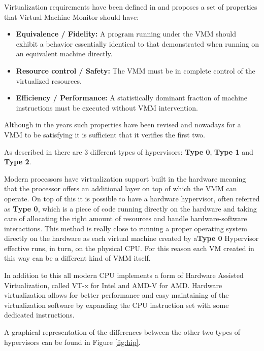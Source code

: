 Virtualization requirements have been defined in \cite{virtreq} and proposes a set of properties that Virtual Machine Monitor should have:

\begin{itemize}
    \item \textbf{Equivalence / Fidelity:} A program running under the VMM should exhibit a behavior essentially identical to that demonstrated when running on an equivalent machine directly.
    \item \textbf{Resource control / Safety:} The VMM must be in complete control of the virtualized resources.
    \item \textbf{Efficiency / Performance:} A statistically dominant fraction of machine instructions must be executed without VMM intervention.
\end{itemize}

Although in the years such properties have been revised and nowadays for a VMM to be satisfying it is sufficient that it verifies the first two. 

As described in\cite{os} there are 3 different types of hypervisors: \textbf{Type 0}, \textbf{Type 1} and \textbf{Type 2}. 

Modern processors have virtualization support built in the hardware meaning that the processor offers an additional layer on top of which the VMM can operate. On top of this it is possible to have a hardware hypervisor, often referred as \textbf{Type 0}, which is a piece of code running directly on the hardware and taking care of allocating the right amount of resources and handle hardware-software interactions. This method is really close to running a proper operating system directly on the hardware as each virtual machine created by a\textbf{Type 0} Hypervisor effective runs, in turn, on the physical CPU. For this reason each VM created in this way can be a different kind of VMM itself.

In addition to this all modern CPU implements a form of Hardware Assisted Virtualization, called VT-x for Intel and AMD-V for AMD. Hardware virtualization allows for better performance and easy maintaining of the virtualization software by expanding the CPU instruction set with some dedicated instructions. 

A graphical representation of the differences between the other two types of hypervisors can be found in Figure \ref{fig:hip}.

